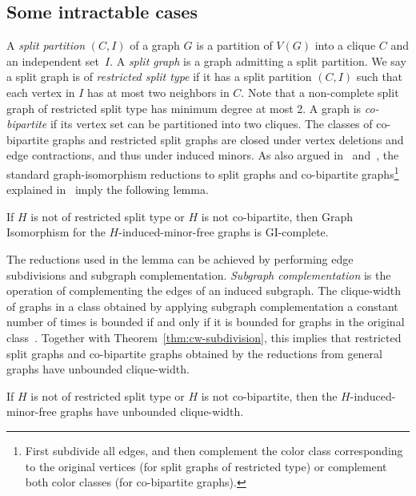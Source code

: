 \documentclass[envcountsame,envcountsect,11pt,a4paper]{llncs}
\begin{document}
\subsection{Some intractable cases}\label{subsec:intractable:cases}
A \emph{split partition} $(C,I)$ of a graph $G$
is a partition of $V(G)$ into a clique $C$ and an independent set~$I$. A \emph{split graph} is a graph admitting a split partition.
We say a split graph is of \emph{restricted split type} if it has a split partition $(C, I)$
such that each vertex in $I$ has at most two neighbors in $C$.
Note that a non-complete split graph of restricted split type has minimum degree at most 2.
A graph is \emph{co-bipartite} if its vertex set can be partitioned into two cliques.
The classes of co-bipartite graphs and restricted split graphs are closed under vertex deletions and edge contractions, and thus under induced minors.
As also argued in~\cite{Ponomarenko88} and~\cite{DBLP:conf/wg/KratschS12},
the standard graph-isomorphism reductions to split graphs and co-bipartite graphs\footnote{First subdivide all edges, and then complement the color class corresponding to the original vertices (for split graphs of restricted type)
or complement both color classes (for co-bipartite graphs).}
explained in~\cite{BoothColbourn1979} imply the following lemma.
\begin{lemma}
\label{lem:type1split_cobipartite}
If $H$ is not of restricted split type or $H$ is not co-bipartite,
then {\sc Graph Isomorphism} for the $H$-induced-minor-free graphs is GI-complete.
\end{lemma}
The reductions used in the lemma can be achieved by performing edge subdivisions and subgraph complementation.
\emph{Subgraph complementation} is the operation of complementing the edges of an induced subgraph.
The clique-width of graphs in a class obtained by applying subgraph complementation a constant number of times
is bounded if and only if it is bounded for graphs in the original class~\cite{KaminskiLozinMilanic2009}.
Together with Theorem~\ref{thm:cw-subdivision}, this implies that restricted split graphs and co-bipartite graphs obtained by the reductions from general graphs have unbounded clique-width.
\begin{corollary}
\label{lem:type1split_cobipartite_cw}
If $H$ is not of restricted split type or $H$ is not co-bipartite,
then the $H$-induced-minor-free graphs have unbounded clique-width.
\end{corollary}
\end{document}
